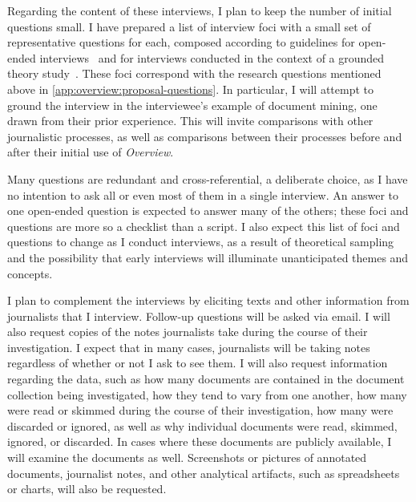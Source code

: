 Regarding the content of these interviews, I plan to keep the number of initial questions small. 
I have prepared a list of interview foci with a small set of representative questions for each, composed according to guidelines for open-ended interviews~\cite{Fontana1994} and for interviews conducted in the context of a grounded theory study~\cite{Charmaz2006}. 
These foci correspond with the research questions mentioned above in \autoref{app:overview:proposal-questions}. 
In particular, I will attempt to ground the interview in the interviewee's example of document mining, one drawn from their prior experience. 
This will invite comparisons with other journalistic processes, as well as comparisons between their processes before and after their initial use of {\it Overview}.

Many questions are redundant and cross-referential, a deliberate choice, as I have no intention to ask all or even most of them in a single interview. 
An answer to one open-ended question is expected to answer many of the others; these foci and questions are more so a checklist than a script. 
I also expect this list of foci and questions to change as I conduct interviews, as a result of theoretical sampling and the possibility that early interviews will illuminate unanticipated themes and concepts.

I plan to complement the interviews by eliciting texts and other information from journalists that I interview. 
Follow-up questions will be asked via email. 
I will also request copies of the notes journalists take during the course of their investigation. 
I expect that in many cases, journalists will be taking notes regardless of whether or not I ask to see them. 
I will also request information regarding the data, such as how many documents are contained in the document collection being investigated, how they tend to vary from one another, how many were read or skimmed during the course of their investigation, how many were discarded or ignored, as well as why individual documents were read, skimmed, ignored, or discarded. 
In cases where these documents are publicly available, I will examine the documents as well. 
Screenshots or pictures of annotated documents, journalist notes, and other analytical artifacts, such as spreadsheets or charts, will also be requested.

